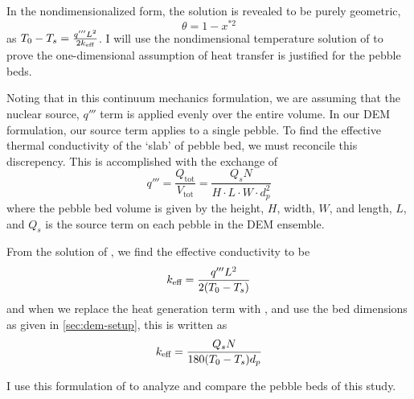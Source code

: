 In the nondimensionalized form, the solution is revealed to be purely geometric,
\begin{equation}\label{eq:continuum-temperature-nondim}
    \theta = 1-x^{*2}
\end{equation}
as $T_0  - T_s = \frac{q'''L^2}{2k_\text{eff}}$. I will use the nondimensional temperature solution of  to prove the one-dimensional assumption of heat transfer is justified for the pebble beds.

Noting that in this continuum mechanics formulation, we are assuming that the nuclear source, $q'''$ term is applied evenly over the entire volume. In our DEM formulation, our source term applies to a single pebble. To find the effective thermal conductivity of the `slab' of pebble bed, we must reconcile this discrepency. This is accomplished with the exchange of
\begin{equation}\label{eq:q-source-translation}
    q''' = \frac{Q_\text{tot}}{V_\text{tot}} = \frac{Q_sN}{H\cdot L\cdot W\cdot d_p^2}
\end{equation}
where the pebble bed volume is given by the height, $H$, width, $W$, and length, $L$, and $Q_s$ is the source term on each pebble in the DEM ensemble. 

From the solution of , we find the effective conductivity to be
\begin{equation}
    k_\text{eff} = \frac{q''' L^2}{2(T_0-T_s)}
\end{equation}
and when we replace the heat generation term with , and use the bed dimensions as given in \cref{sec:dem-setup}, this is written as
\begin{equation}\label{eq:dem-effecitve-conductivity-formula}
    k_\text{eff} = \frac{Q_sN}{180(T_0-T_s)d_p}
\end{equation}

I use this formulation of  to analyze and compare the pebble beds of this study.



